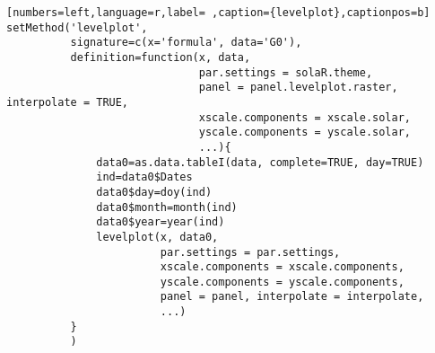 \begin{lstlisting}[numbers=left,language=r,label= ,caption={levelplot},captionpos=b]
setMethod('levelplot',
          signature=c(x='formula', data='G0'),
          definition=function(x, data,
                              par.settings = solaR.theme,
                              panel = panel.levelplot.raster, interpolate = TRUE,
                              xscale.components = xscale.solar,
                              yscale.components = yscale.solar,
                              ...){
              data0=as.data.tableI(data, complete=TRUE, day=TRUE)
              ind=data0$Dates
              data0$day=doy(ind)
              data0$month=month(ind)
              data0$year=year(ind)
              levelplot(x, data0, 
                        par.settings = par.settings,
                        xscale.components = xscale.components,
                        yscale.components = yscale.components,
                        panel = panel, interpolate = interpolate,
                        ...)
          }
          )
\end{lstlisting}
